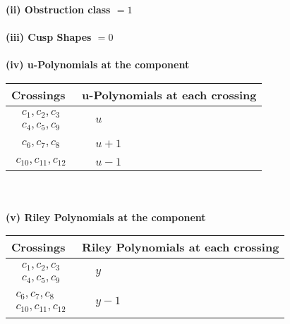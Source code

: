 \documentclass[1p]{elsarticle_modified}
\theoremstyle{definition}
\begin{document}
\flushleft \textbf{(ii) Obstruction class $= 1$}\\~\\
\flushleft \textbf{(iii) Cusp Shapes $= 0$}\\~\\
\newpage\renewcommand{\arraystretch}{1}
\flushleft \textbf{(iv) u-Polynomials at the component}\newline \\
\begin{tabular}{m{50pt}|m{274pt}}
Crossings & \hspace{64pt}u-Polynomials at each crossing \\
\hline $$\begin{aligned}c_{1},c_{2},c_{3}\\c_{4},c_{5},c_{9}\end{aligned}$$&$\begin{aligned}
&u
\end{aligned}$\\
\hline $$\begin{aligned}c_{6},c_{7},c_{8}\end{aligned}$$&$\begin{aligned}
&u+1
\end{aligned}$\\
\hline $$\begin{aligned}c_{10},c_{11},c_{12}\end{aligned}$$&$\begin{aligned}
&u-1
\end{aligned}$\\
\hline
\end{tabular}\\~\\
\newpage\renewcommand{\arraystretch}{1}
\flushleft \textbf{(v) Riley Polynomials at the component}\newline \\
\begin{tabular}{m{50pt}|m{274pt}}
Crossings & \hspace{64pt}Riley Polynomials at each crossing \\
\hline $$\begin{aligned}c_{1},c_{2},c_{3}\\c_{4},c_{5},c_{9}\end{aligned}$$&$\begin{aligned}
&y
\end{aligned}$\\
\hline $$\begin{aligned}c_{6},c_{7},c_{8}\\c_{10},c_{11},c_{12}\end{aligned}$$&$\begin{aligned}
&y-1
\end{aligned}$\\
\hline
\end{tabular}\\~\\
\end{document}
